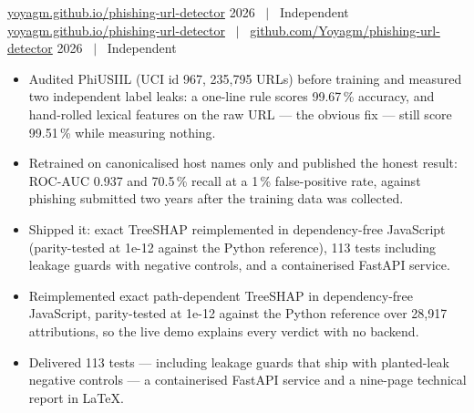 \ifonepage
{}%
  {\href{https://yoyagm.github.io/phishing-url-detector/}{yoyagm.github.io/phishing-url-detector}}%
  {2026 \ $\vert$ \ Independent}
\else
{}%
  {\href{https://yoyagm.github.io/phishing-url-detector/}{yoyagm.github.io/phishing-url-detector}
   \ $\vert$ \ \href{https://github.com/Yoyagm/phishing-url-detector}{github.com/Yoyagm/phishing-url-detector}}%
  {2026 \ $\vert$ \ Independent}
\fi
\begin{itemize}
  \item Audited PhiUSIIL (UCI id 967, 235{,}795 URLs) before training and measured two independent
        label leaks: a one-line rule scores 99.67\,\% accuracy, and hand-rolled lexical features on the
        raw URL --- the obvious fix --- still score 99.51\,\% while measuring nothing.
  \item Retrained on canonicalised host names only and published the honest result: ROC-AUC 0.937 and
        70.5\,\% recall at a 1\,\% false-positive rate, against phishing submitted two years after the
        training data was collected.
  \ifonepage
  \item Shipped it: exact TreeSHAP reimplemented in dependency-free JavaScript (parity-tested at 1e-12
        against the Python reference), 113 tests including leakage guards with negative controls, and a
        containerised FastAPI service.
  \else
  \item Reimplemented exact path-dependent TreeSHAP in dependency-free JavaScript, parity-tested at
        1e-12 against the Python reference over 28{,}917 attributions, so the live demo explains every
        verdict with no backend.
  \item Delivered 113 tests --- including leakage guards that ship with planted-leak negative controls
        --- a containerised FastAPI service and a nine-page technical report in LaTeX.
  \fi
\end{itemize}

